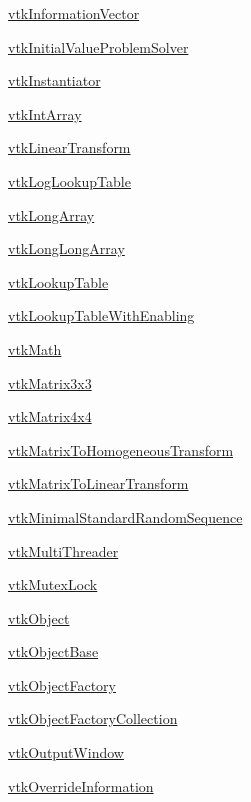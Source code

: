 \begin{DoxyItemize}
\item \hyperlink{vtkcommon_vtkinformationvector}{vtk\-Information\-Vector}  
\item \hyperlink{vtkcommon_vtkinitialvalueproblemsolver}{vtk\-Initial\-Value\-Problem\-Solver}  
\item \hyperlink{vtkcommon_vtkinstantiator}{vtk\-Instantiator}  
\item \hyperlink{vtkcommon_vtkintarray}{vtk\-Int\-Array}  
\item \hyperlink{vtkcommon_vtklineartransform}{vtk\-Linear\-Transform}  
\item \hyperlink{vtkcommon_vtkloglookuptable}{vtk\-Log\-Lookup\-Table}  
\item \hyperlink{vtkcommon_vtklongarray}{vtk\-Long\-Array}  
\item \hyperlink{vtkcommon_vtklonglongarray}{vtk\-Long\-Long\-Array}  
\item \hyperlink{vtkcommon_vtklookuptable}{vtk\-Lookup\-Table}  
\item \hyperlink{vtkcommon_vtklookuptablewithenabling}{vtk\-Lookup\-Table\-With\-Enabling}  
\item \hyperlink{vtkcommon_vtkmath}{vtk\-Math}  
\item \hyperlink{vtkcommon_vtkmatrix3x3}{vtk\-Matrix3x3}  
\item \hyperlink{vtkcommon_vtkmatrix4x4}{vtk\-Matrix4x4}  
\item \hyperlink{vtkcommon_vtkmatrixtohomogeneoustransform}{vtk\-Matrix\-To\-Homogeneous\-Transform}  
\item \hyperlink{vtkcommon_vtkmatrixtolineartransform}{vtk\-Matrix\-To\-Linear\-Transform}  
\item \hyperlink{vtkcommon_vtkminimalstandardrandomsequence}{vtk\-Minimal\-Standard\-Random\-Sequence}  
\item \hyperlink{vtkcommon_vtkmultithreader}{vtk\-Multi\-Threader}  
\item \hyperlink{vtkcommon_vtkmutexlock}{vtk\-Mutex\-Lock}  
\item \hyperlink{vtkcommon_vtkobject}{vtk\-Object}  
\item \hyperlink{vtkcommon_vtkobjectbase}{vtk\-Object\-Base}  
\item \hyperlink{vtkcommon_vtkobjectfactory}{vtk\-Object\-Factory}  
\item \hyperlink{vtkcommon_vtkobjectfactorycollection}{vtk\-Object\-Factory\-Collection}  
\item \hyperlink{vtkcommon_vtkoutputwindow}{vtk\-Output\-Window}  
\item \hyperlink{vtkcommon_vtkoverrideinformation}{vtk\-Override\-Information}  

\end{DoxyItemize}

